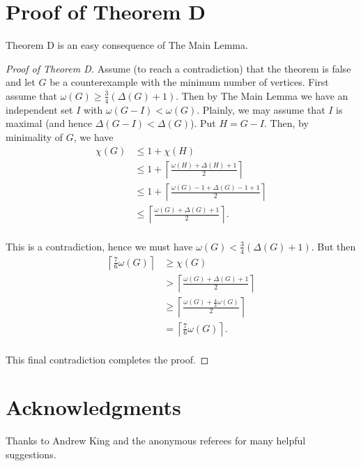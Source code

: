 \documentclass[12pt]{article}
\theoremstyle{plain}
\theoremstyle{definition}
\theoremstyle{remark}
\begin{document}
\section{Proof of Theorem D}
Theorem D is an easy consequence of The Main Lemma.
\begin{proof}[Proof of Theorem D]
Assume (to reach a contradiction) that the theorem is false and let $G$ be a counterexample with the minimum number of vertices.  First assume that $\omega(G) \geq \frac{3}{4}(\Delta(G) + 1)$.  Then by The Main Lemma we have an independent set $I$ with $\omega(G - I) < \omega(G)$.  Plainly, we may assume that $I$ is maximal (and hence $\Delta(G - I) < \Delta(G)$). Put $H = G - I$.  Then, by minimality of $G$, we have
\begin{align*}
\chi(G) &\leq 1 + \chi(H) \\
&\leq 1 + \left\lceil \frac{\omega(H) + \Delta(H) + 1}{2}\right\rceil \\
&\leq 1 + \left\lceil \frac{\omega(G) - 1 + \Delta(G) - 1 + 1}{2}\right\rceil \\
&\leq \left\lceil \frac{\omega(G) + \Delta(G) + 1}{2}\right\rceil. \\
\end{align*}

This is a contradiction, hence we must have $\omega(G) < \frac{3}{4}(\Delta(G) + 1)$.  But then
\begin{align*}
\left\lceil \frac{7}{6}\omega(G) \right\rceil &\geq \chi(G) \\
&> \left\lceil \frac{\omega(G) + \Delta(G) + 1}{2}\right\rceil \\
&\geq \left\lceil \frac{\omega(G) + \frac{4}{3}\omega(G)}{2}\right\rceil \\
&= \left\lceil \frac{7}{6}\omega(G) \right\rceil. \\
\end{align*}

This final contradiction completes the proof.
\end{proof}

\section*{Acknowledgments}
Thanks to Andrew King and the anonymous referees for many helpful suggestions.
\end{document}
